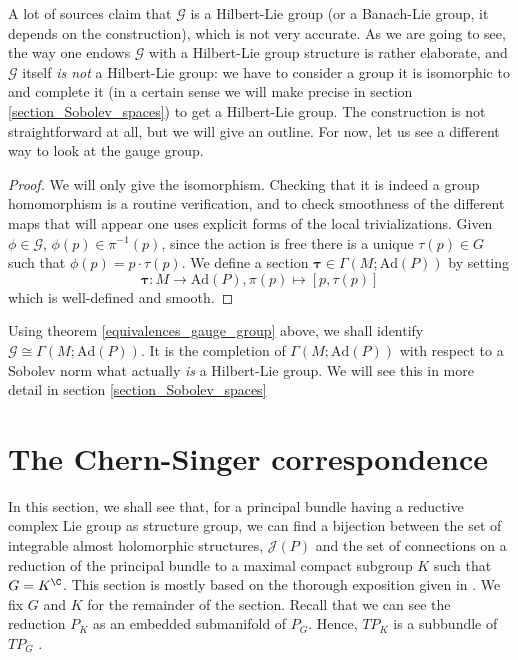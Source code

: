 A lot of sources claim that \(\mathscr{G}\) is a Hilbert-Lie group (or a Banach-Lie group, it depends on the construction), which is not very accurate. As we are going to see, the way one endows \(\mathscr{G}\) with a Hilbert-Lie group structure is rather elaborate, and \(\mathscr{G}\) itself \textit{is not} a Hilbert-Lie group: we have to consider a group it is isomorphic to and complete it (in a certain sense we will make precise in section \ref{section_Sobolev_spaces}) to get a Hilbert-Lie group. The construction is not straightforward at all, but we will give an outline. For now, let us see a different way to look at the gauge group.
\begin{proof}
    We will only give the isomorphism. Checking that it is indeed a group homomorphism is a routine verification, and to check smoothness of the different maps that will appear one uses explicit forms of the local trivializations. Given \(\phi \in \mathscr{G}\), \(\phi(p)\in \pi^{-1}(p)\), since the action is free there is a unique \(\tau(p)\in G\) such that \(\phi(p)=p\cdot \tau(p)\). We define a section \(\bm{\tau}\in \Gamma(M; \mathrm{Ad}(P))\) by setting 
    \[
    \bm{\tau}\colon M \to \mathrm{Ad}(P), \pi(p) \mapsto [p, \tau(p)]
    \]
    which is well-defined and smooth.
\end{proof}

Using theorem \ref{equivalences_gauge_group} above, we shall identify \(\mathscr{G}\cong \Gamma(M; \mathrm{Ad}(P))\). It is the completion of \(\Gamma(M; \mathrm{Ad}(P))\) with respect to a Sobolev norm what actually \textit{is} a Hilbert-Lie group. We will see this in more detail in section \ref{section_Sobolev_spaces}

\section{The Chern-Singer correspondence} \label{section_Chern_Singer_correspondence}
In this section, we shall see that, for a principal bundle having a reductive complex Lie group as structure group, we can find a bijection between the set of integrable almost holomorphic structures, \(\mathscr{J}(P)\) and the set of connections on a reduction of the principal bundle to a maximal compact subgroup \(K\) such that \(G=K^\C\). This section is mostly based on the thorough exposition given in \parencite{Sandon_Chern_Correspondence}. We fix \(G\) and \(K\) for the remainder of the section. Recall that we can see the reduction \(P_K\) as an embedded submanifold of \(P_G\). Hence, \(TP_K\) is a subbundle of \(TP_G\) \parencite[Example 10.33-(c)]{lee_introSM}.

